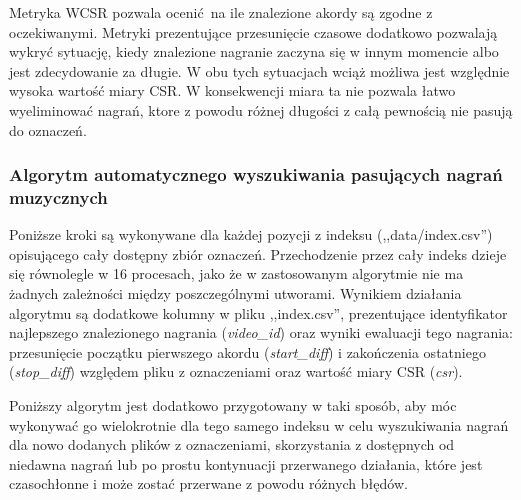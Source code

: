 Metryka WCSR pozwala ocenić na ile znalezione akordy są zgodne z oczekiwanymi. Metryki prezentujące
przesunięcie czasowe dodatkowo pozwalają wykryć sytuację, kiedy znalezione nagranie zaczyna się w
innym momencie albo jest zdecydowanie za długie. W obu tych sytuacjach wciąż możliwa jest względnie
wysoka wartość miary CSR. W konsekwencji miara ta nie pozwala łatwo wyeliminować nagrań, ktore z
powodu różnej długości z całą pewnością nie pasują do oznaczeń.

\subsubsection{Algorytm automatycznego wyszukiwania pasujących nagrań muzycznych}
Poniższe kroki są wykonywane dla każdej pozycji z indeksu (,,data/index.csv'') opisującego cały
dostępny zbiór oznaczeń. Przechodzenie przez cały indeks dzieje się równolegle w 16 procesach, jako
że w zastosowanym algorytmie nie ma żadnych zależności między poszczególnymi utworami. Wynikiem
działania algorytmu są dodatkowe kolumny w pliku ,,index.csv'', prezentujące identyfikator
najlepszego znalezionego nagrania (\emph{video\_id}) oraz wyniki ewaluacji tego nagrania:
przesunięcie początku pierwszego akordu (\emph{start\_diff}) i zakończenia ostatniego
(\emph{stop\_diff}) względem pliku z oznaczeniami oraz wartość miary CSR (\emph{csr}).

Poniższy algorytm jest dodatkowo przygotowany w taki sposób, aby móc wykonywać go wielokrotnie dla
tego samego indeksu w celu wyszukiwania nagrań dla nowo dodanych plików z oznaczeniami, skorzystania
z dostępnych od niedawna nagrań lub po prostu kontynuacji przerwanego działania, które jest
czasochłonne i może zostać przerwane z powodu różnych błędów.

